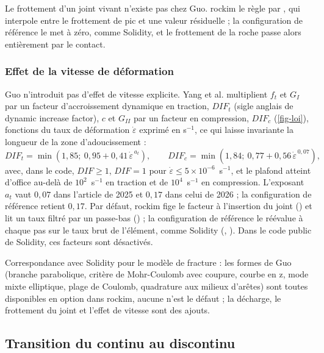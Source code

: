 Le frottement d'un joint vivant n'existe pas chez Guo. rockim le règle par , qui interpole entre le frottement de pic et une valeur résiduelle ; la configuration de référence le met à zéro, comme Solidity, et le frottement de la roche passe alors entièrement par le contact.

\subsubsection{Effet de la vitesse de déformation}

Guo n'introduit pas d'effet de vitesse explicite. Yang et al. multiplient $f_t$ et $G_I$ par un facteur d'accroissement dynamique en traction, $DIF_t$ (sigle anglais de dynamic increase factor), $c$ et $G_{II}$ par un facteur en compression, $DIF_c$ (\cref{fig-loi}), fonctions du taux de déformation $\dot\varepsilon$ exprimé en s$^{-1}$, ce qui laisse invariante la longueur de la zone d'adoucissement :
\begin{equation}
DIF_t = \min\left(1{,}85;\ 0{,}95 + 0{,}41\,\dot\varepsilon^{\,a_t}\right), \qquad
DIF_c = \min\left(1{,}84;\ 0{,}77 + 0{,}56\,\dot\varepsilon^{\,0{,}07}\right) ,
\label{eq-dif}
\end{equation}
avec, dans le code, $DIF \geq 1$, $DIF = 1$ pour $\dot\varepsilon \leq 5\times10^{-6}$~s$^{-1}$, et le plafond atteint d'office au-delà de $10^2$~s$^{-1}$ en traction et de $10^4$~s$^{-1}$ en compression. L'exposant $a_t$ vaut $0{,}07$ dans l'article de 2025 et $0{,}17$ dans celui de 2026 ; la configuration de référence retient $0{,}17$. Par défaut, rockim fige le facteur à l'insertion du joint () et lit un taux filtré par un passe-bas () ; la configuration de référence le réévalue à chaque pas sur le taux brut de l'élément, comme Solidity (, ). Dans le code public de Solidity, ces facteurs sont désactivés.

Correspondance avec Solidity pour le modèle de fracture : les formes de Guo (branche parabolique, critère de Mohr-Coulomb avec coupure, courbe en z, mode mixte elliptique, plage de Coulomb, quadrature aux milieux d'arêtes) sont toutes disponibles en option dans rockim, aucune n'est le défaut ; la décharge, le frottement du joint et l'effet de vitesse sont des ajouts.

\subsection{Transition du continu au discontinu}
\label{sec-transition}

